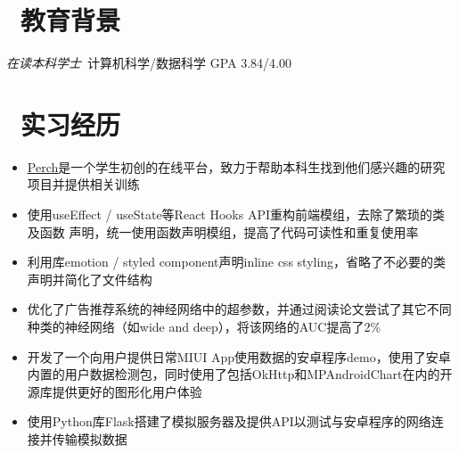 \documentclass{resume}
\begin{document}


 
\section{\faGraduationCap\  教育背景}
\textit{在读本科学士}\ 计算机科学/数据科学 \hfill GPA 3.84/4.00

\section{\faUsers\ 实习经历}
\vspace{-2mm}
\begin{onehalfspacing}
\begin{itemize}
	\item \href{http://umich.edu/~perchres/}{\underline{Perch}}是一个学生初创的在线平台，致力于帮助本科生找到他们感兴趣的研究项目并提供相关训练
	\item 使用useEffect / useState等React Hooks API重构前端模组，去除了繁琐的类及函数 声明，统一使用函数声明模组，提高了代码可读性和重复使用率
	\item 利用库emotion / styled component声明inline css styling，省略了不必要的类声明并简化了文件结构
\end{itemize}
\end{onehalfspacing}

\vspace{-2mm}
\begin{onehalfspacing}
\begin{itemize}
	\item 优化了广告推荐系统的神经网络中的超参数，并通过阅读论文尝试了其它不同种类的神经网络（如wide and deep），将该网络的AUC提高了2\%
	\item 开发了一个向用户提供日常MIUI App使用数据的安卓程序demo，使用了安卓内置的用户数据检测包，同时使用了包括OkHttp和MPAndroidChart在内的开源库提供更好的图形化用户体验
	\item 使用Python库Flask搭建了模拟服务器及提供API以测试与安卓程序的网络连接并传输模拟数据
\end{itemize}
\end{onehalfspacing}
\end{document}
